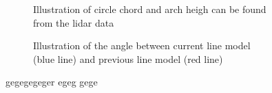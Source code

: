 \documentclass[../Head/Main.tex]{subfiles}
\begin{document}
\begin{figure}[H]
	\begin{subfigure}[b]{0.49\textwidth}
		\centering
		
		\caption{Illustration of circle chord and arch heigh can be found from the lidar data}
		\label{fig:lidar_marble_detec}
  	\end{subfigure}
  	\hfill
  	\begin{subfigure}[b]{0.49\textwidth}
		\centering
		
		\caption{Illustration of the angle between current line model (blue line) and previous line model (red line)}
		\label{fig:lidar_marble_scaled}
  	\end{subfigure}
  	\caption{gegegegeger egeg gege}
  	\label{fig:lidar_marble}
\end{figure}
\end{document}
